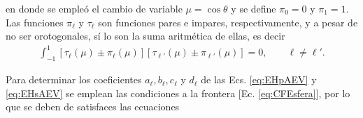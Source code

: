\noindent
en donde se empleó el cambio de variable $\mu = \cos\theta$ y se define   $\pi_0 =0 $ y $\pi_1 = 1$.  Las funciones $\pi_\ell$ y $\tau_\ell$ son funciones pares e impares, respectivamente, y a pesar de no ser orotogonales, sí lo son la suma aritmética de ellas, es decir \cite{bohren1998absorption}
	\begin{align}
	\int_{-1}^{1}[\tau_\ell(\mu)\pm\pi_\ell(\mu)]
	[\tau_{\ell'}(\mu)\pm\pi_{\ell'}(\mu)] = 0, \qquad \ell\neq \ell'. 
	\label{eq:ortTauPi}
	\end{align}

Para determinar los coeficientes $a_\ell,b_\ell,c_\ell$ y $d_\ell$ de las Ecs. \eqref{eq:EHpAEV} y \eqref{eq:EHsAEV} se emplean las condiciones a la frontera [Ec. \eqref{eq:CFEsfera}], por lo que se deben de satisfaces las ecuaciones

	\vspace*{-1em}


